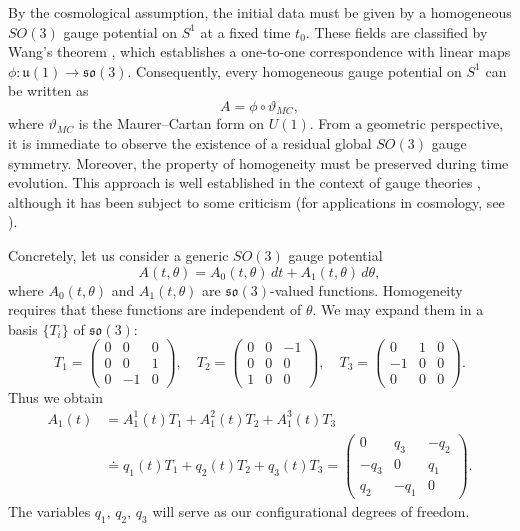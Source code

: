 \documentclass{article}
\numberwithin{equation}{section}
\theoremstyle{definition}
\begin{document}
By the cosmological assumption, the initial data must be given by a homogeneous $SO(3)$ gauge potential on $S^1$ at a fixed time $t_0$. These fields are classified by Wang’s theorem \cite{Wang_1958}, which establishes a one-to-one correspondence with linear maps $\phi:\mathfrak{u}(1)\to\mathfrak{so}(3)$. Consequently, every homogeneous gauge potential on $S^1$ can be written as
\begin{equation}
    A=\phi\circ\vartheta_{MC},
\end{equation}
where $\vartheta_{MC}$ is the Maurer--Cartan form on $U(1)$. From a geometric perspective, it is immediate to observe the existence of a residual global $SO(3)$ gauge symmetry. Moreover, the property of homogeneity must be preserved during time evolution. This approach is well established in the context of gauge theories \cite{Harnad_Shnider_Vinet_1980,Bojowald_Kastrup_2000}, although it has been subject to some criticism (for applications in cosmology, see \cite{Bojowald_2000,Bruno_23,Bruno_2025}).

Concretely, let us consider a generic $SO(3)$ gauge potential
\begin{equation}
    A(t,\theta)=A_0(t,\theta)\,dt+A_1(t,\theta)\,d\theta,
\end{equation}
where $A_0(t,\theta)$ and $A_1(t,\theta)$ are $\mathfrak{so}(3)$-valued functions. Homogeneity requires that these functions are independent of $\theta$. We may expand them in a basis $\{T_i\}$ of $\mathfrak{so}(3)$:
\[
T_1=\begin{pmatrix}
0 & 0 & 0\\
0 & 0 & 1\\
0 & -1 & 0
\end{pmatrix},\quad
T_2=\begin{pmatrix}
0 & 0 & -1\\
0 & 0 & 0\\
1 & 0 & 0
\end{pmatrix},\quad
T_3=\begin{pmatrix}
0 & 1 & 0\\
-1 & 0 & 0\\
0 & 0 & 0
\end{pmatrix}.
\]
Thus we obtain
\begin{equation}
    \begin{split}
        A_1(t)&=A^1_1(t)T_1+A^2_1(t)T_2+A^3_1(t)T_3\\
&\doteq q_1(t)T_1+q_2(t)T_2+q_3(t)T_3
=\begin{pmatrix}
0 & q_3 & -q_2\\
-q_3 & 0 & q_1\\
q_2 & -q_1 & 0
\end{pmatrix}.
    \end{split}
\end{equation}
The variables $q_1,\,q_2,\,q_3$ will serve as our configurational degrees of freedom.  
\end{document}
